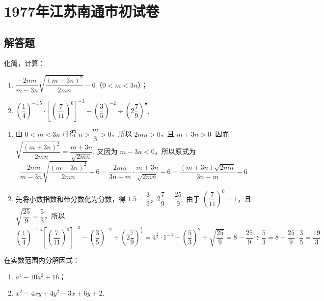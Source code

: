 \chapter{1977年江苏南通市初试卷}

\section{解答题}

\begin{problem}
化简，计算：

\begin{enumerate}
\item \(\dfrac{-2mn}{m-3n}\sqrt{\dfrac{\left(m+3n\right)^2}{2mn}}-6\)（\(0<m<3n\)）；
\item \(\left(\dfrac14\right)^{-1.5}\cdot\left[\left(\dfrac7{11}\right)^0\right]^{-3}-\left(\dfrac35\right)^{-2}\div\left(2\dfrac79\right)^{\frac12}\).
\end{enumerate}
\end{problem}

\begin{solution}
\begin{enumerate}
\item 由 \(0<m<3n\) 可得 \(n>\dfrac{m}{3}>0\)，所以 \(2mn>0\)，且 \(m+3n>0\). 因而 \(\sqrt{\dfrac{\left(m+3n\right)^2}{2mn}}=\dfrac{m+3n}{\sqrt{2mn}}\). 又因为 \(m-3n<0\)，所以原式为
\[
\dfrac{-2mn}{m-3n}\sqrt{\dfrac{\left(m+3n\right)^2}{2mn}}-6
=\dfrac{2mn}{3n-m}\cdot\dfrac{m+3n}{\sqrt{2mn}}-6
=\dfrac{\left(m+3n\right)\sqrt{2mn}}{3n-m}-6
\]

\item 先将小数指数和带分数化为分数，得 \(1.5=\dfrac32\)，\(2\dfrac79=\dfrac{25}{9}\). 由于 \(\left(\dfrac7{11}\right)^0=1\)，且 \(\sqrt{\dfrac{25}{9}}=\dfrac53\)，所以
\[
\left(\dfrac14\right)^{-1.5}\left[\left(\dfrac7{11}\right)^0\right]^{-3}-\left(\dfrac35\right)^{-2}\div\left(2\dfrac79\right)^{\frac12}
=4^{\frac32}\cdot1^{-3}-\left(\dfrac53\right)^2\div\sqrt{\dfrac{25}{9}}
=8-\dfrac{25}{9}\div\dfrac53
=8-\dfrac{25}{9}\cdot\dfrac35=\dfrac{19}{3}
\]
\end{enumerate}
\end{solution}

\begin{problem}
在实数范围内分解因式：

\begin{enumerate}
\item \(a^4-10a^2+16\)；
\item \(x^2-4xy+4y^2-3x+6y+2\).
\end{enumerate}
\end{problem}

